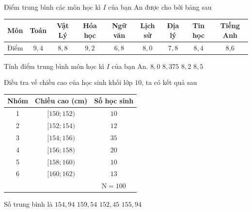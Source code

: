 \begin{ex}%
	Điểm trung bình các môn học kì $I$ của bạn An được cho bởi bảng sau
	\begin{center}
		\begin{tabular}{|c|c|c|c|c|c|c|c|c|}
			\hline Môn & Toán & Vật Lý & Hóa học & Ngữ văn & Lịch sử & Địa lý & Tin học & Tiếng Anh \\
			\hline Điểm & $9{,}4$ & $8{,}8$ & $9{,}2$ & $6{,}8$ & $8{,}0$ & $7{,}8$ & $8{,}4$ & 8{,}6 \\
			\hline
		\end{tabular}
	\end{center}
	Tính điểm trung bình môn học kì $I$ của bạn An.
	\choice
	{$8{,}0$}
	{\True ${8{,}375}$}
	{${8{,}2}$}
	{$8{,}5$}
\end{ex}

\begin{ex}%
	Điều tra về chiều cao của học sinh khối lớp $10$, ta có kết quả sau
	\begin{center}
		\begin{tabular}{|c|c|c|}
			\hline Nhóm & Chiều cao (cm) & Số học sinh \\
			\hline 1 & {$[150 ; 152)$} & $10$ \\
			\hline 2 & {$[152 ; 154)$} & $12$ \\
			\hline 3 & {$[154 ; 156)$} & $35$ \\
			\hline 4 & {$[156 ; 158)$} & $20$ \\
			\hline 5 & {$[158 ; 160)$} & $10$ \\
			\hline 6 & {$[160 ; 162)$} & $13$ \\
			\hline \multicolumn{2}{|c|}{} & $\mathrm{N}=100$ \\
			\hline
		\end{tabular}
	\end{center}
	Số trung bình là
	\choice
	{$154{,}94$}
	{$159{,}54$}
	{$152{,}45$}
	{\True $155{,}94$}
\end{ex}

